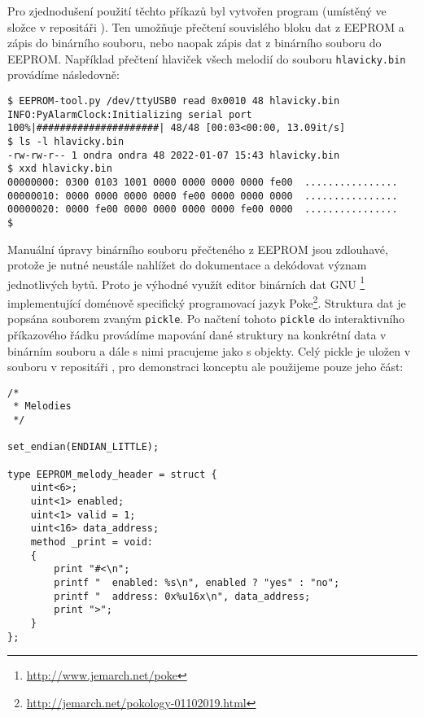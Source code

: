Pro zjednodušení použití těchto příkazů byl vytvořen program
 (umístěný ve složce  v repositáři
). Ten umožňuje přečtení souvislého bloku dat z EEPROM
a zápis do binárního souboru, nebo naopak zápis dat z binárního souboru do
EEPROM. Například přečtení hlaviček všech melodií do souboru
\texttt{hlavicky.bin} provádíme následovně:
\begin{lstlisting}[style=terminal]
$ EEPROM-tool.py /dev/ttyUSB0 read 0x0010 48 hlavicky.bin
INFO:PyAlarmClock:Initializing serial port
100%|#####################| 48/48 [00:03<00:00, 13.09it/s]
$ ls -l hlavicky.bin
-rw-rw-r-- 1 ondra ondra 48 2022-01-07 15:43 hlavicky.bin
$ xxd hlavicky.bin
00000000: 0300 0103 1001 0000 0000 0000 0000 fe00  ................
00000010: 0000 0000 0000 0000 fe00 0000 0000 0000  ................
00000020: 0000 fe00 0000 0000 0000 0000 fe00 0000  ................
$
\end{lstlisting}

Manuální úpravy binárního souboru přečteného z EEPROM jsou zdlouhavé, protože
je nutné neustále nahlížet do dokumentace a dekódovat význam jednotlivých bytů.
Proto je výhodné využít editor binárních dat GNU
\footnote{\url{http://www.jemarch.net/poke}} implementující
doménově specifický programovací jazyk
Poke\footnote{\url{http://jemarch.net/pokology-01102019.html}}.
Struktura dat je popsána souborem zvaným \texttt{pickle}. Po načtení tohoto
\texttt{pickle} do interaktivního příkazového řádku  provádíme
mapování dané struktury na konkrétní data v binárním souboru a dále s nimi
pracujeme jako s objekty. Celý pickle je uložen v souboru
 v repositáři , pro
demonstraci konceptu ale použijeme pouze jeho část:
\begin{lstlisting}[language=Poke]
/*
 * Melodies
 */

set_endian(ENDIAN_LITTLE);

type EEPROM_melody_header = struct {
    uint<6>;
    uint<1> enabled;
    uint<1> valid = 1;
    uint<16> data_address;
    method _print = void:
    {
        print "#<\n";
        printf "  enabled: %s\n", enabled ? "yes" : "no";
        printf "  address: 0x%u16x\n", data_address;
        print ">";
    }
};
\end{lstlisting}

